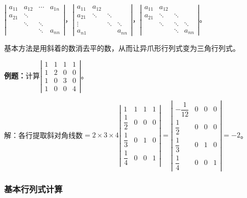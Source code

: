 \documentclass[UTF8, 12pt]{ctexart}
\begin{document}
$\left|\begin{array}{cccc} 
    a_{11} & a_{12} & \cdots & a_{1n} \\
    a_{21} & \ddots & & \\
     & \ddots & \ddots &  \\
     & & \ddots & a_{nn}
\end{array}\right|$，$\left|\begin{array}{cccc} 
    a_{11} & a_{12} & & \\
    a_{21} & \ddots & \ddots & \\
    \vdots & & \ddots & \ddots \\
    a_{n1} & & & a_{nn}
\end{array}\right|$，$\left|\begin{array}{cccc} 
    a_{11} & a_{12} & & \\
    a_{21} & \ddots & \ddots & \\
     & \ddots & \ddots & \ddots \\
     & & \ddots & a_{nn}
\end{array}\right|$。

基本方法是用斜着的数消去平的数，从而让异爪形行列式变为三角行列式。

\textbf{例题：}计算$\left|\begin{array}{cccc} 
    1 & 1 & 1 & 1 \\
    1 & 2 & 0 & 0 \\
    1 & 0 & 3 & 0 \\
    1 & 0 & 0 & 4
\end{array}\right|$。

解：各行提取斜对角线数$=2\times3\times4\left|\begin{array}{cccc} 
    1 & 1 & 1 & 1 \\
    \dfrac{1}{2} & 0 & 0 & 0 \\
    \dfrac{1}{3} & 0 & 1 & 0 \\
    \dfrac{1}{4} & 0 & 0 & 1
\end{array}\right|=\left|\begin{array}{cccc} 
    -\dfrac{1}{12} & 0 & 0 & 0 \\
    \dfrac{1}{2} & 0 & 0 & 0 \\
    \dfrac{1}{3} & 0 & 1 & 0 \\
    \dfrac{1}{4} & 0 & 0 & 1
\end{array}\right|=-2$。

\subsubsection{基本行列式计算}
\end{document}
